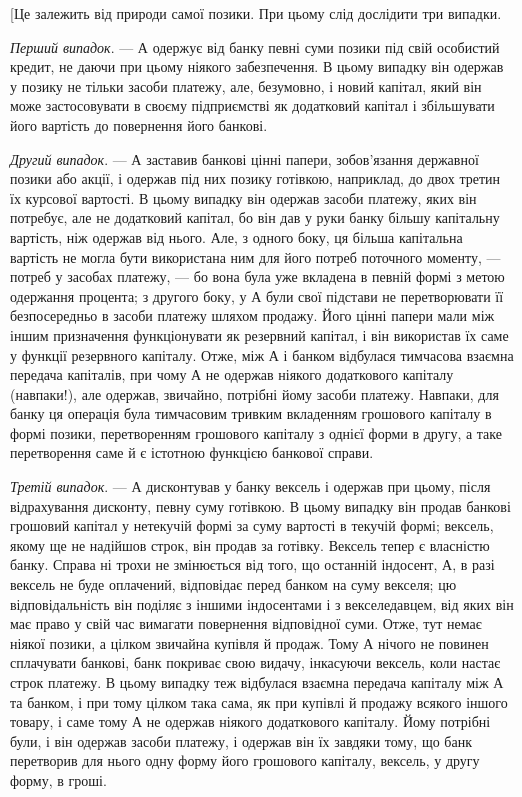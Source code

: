 [Це залежить від природи самої позики. При цьому слід
дослідити три випадки.

\emph{Перший випадок}. — $А$ одержує від банку певні суми позики під
свій особистий кредит, не даючи при цьому ніякого забезпечення.
В цьому випадку він одержав у позику не тільки засоби платежу,
але, безумовно, і новий капітал, який він може застосовувати
в своєму підприємстві як додатковий капітал і збільшувати
його вартість до повернення його банкові.

\emph{Другий випадок}. — $А$ заставив банкові цінні папери, зобов’язання
державної позики або акції, і одержав під них позику
готівкою, наприклад, до двох третин їх курсової вартості. В
цьому випадку він одержав засоби платежу, яких він потребує,
але не додатковий капітал, бо він дав у руки банку більшу
капітальну вартість, ніж одержав від нього. Але, з одного боку,
ця більша капітальна вартість не могла бути використана ним
для його потреб поточного моменту, — потреб у засобах платежу,
— бо вона була уже вкладена в певній формі з метою одержання
процента; з другого боку, у $А$ були свої підстави не перетворювати
її безпосередньо в засоби платежу шляхом продажу.
Його цінні папери мали між іншим призначення функціонувати
як резервний капітал, і він використав їх саме у функції резервного
капіталу. Отже, між $А$ і банком відбулася тимчасова взаємна
передача капіталів, при чому $А$ не одержав ніякого додаткового
капіталу (навпаки!), але одержав, звичайно, потрібні йому засоби
платежу. Навпаки, для банку ця операція була тимчасовим тривким
вкладенням грошового капіталу в формі позики, перетворенням
грошового капіталу з однієї форми в другу, а таке
перетворення саме й є істотною функцією банкової справи.

\emph{Третій випадок}. — $А$ дисконтував у банку вексель і одержав
при цьому, після відрахування дисконту, певну суму готівкою.
В цьому випадку він продав банкові грошовий капітал у нетекучій
формі за суму вартості в текучій формі; вексель, якому
ще не надійшов строк, він продав за готівку. Вексель тепер
є власністю банку. Справа ні трохи не змінюється від того, що
останній індосент, $А$, в разі вексель не буде оплачений, відповідає
перед банком на суму векселя; цю відповідальність він
поділяє з іншими індосентами і з векселедавцем, від яких він має
право у свій час вимагати повернення відповідної суми. Отже,
тут немає ніякої позики, а цілком звичайна купівля й продаж.
Тому $А$ нічого не повинен сплачувати банкові, банк покриває
свою видачу, інкасуючи вексель, коли настає строк платежу.
В цьому випадку теж відбулася взаємна передача капіталу між $А$
та банком, і при тому цілком така сама, як при купівлі й продажу
всякого іншого товару, і саме тому $А$ не одержав ніякого
додаткового капіталу. Йому потрібні були, і він одержав засоби
платежу, і одержав він їх завдяки тому, що банк перетворив
для нього одну форму його грошового капіталу, вексель, у
другу форму, в гроші.

